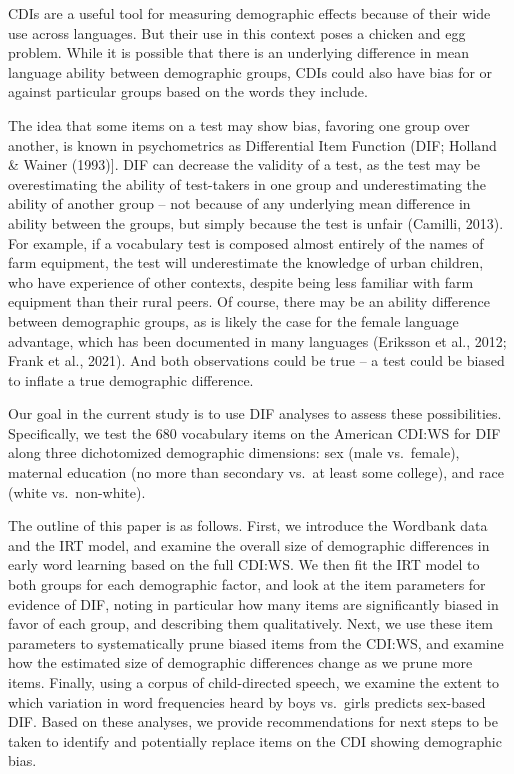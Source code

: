 \documentclass[10pt, letterpaper]{article}
\begin{document}
CDIs are a useful tool for measuring demographic effects because of
their wide use across languages. But their use in this context poses a
chicken and egg problem. While it is possible that there is an
underlying difference in mean language ability between demographic
groups, CDIs could also have bias for or against particular groups based
on the words they include.

The idea that some items on a test may show bias, favoring one group
over another, is known in psychometrics as Differential Item Function
(DIF; Holland \& Wainer (1993){]}. DIF can decrease the validity of a
test, as the test may be overestimating the ability of test-takers in
one group and underestimating the ability of another group -- not
because of any underlying mean difference in ability between the groups,
but simply because the test is unfair (Camilli, 2013). For example, if a
vocabulary test is composed almost entirely of the names of farm
equipment, the test will underestimate the knowledge of urban children,
who have experience of other contexts, despite being less familiar with
farm equipment than their rural peers. Of course, there may be an
ability difference between demographic groups, as is likely the case for
the female language advantage, which has been documented in many
languages (Eriksson et al., 2012; Frank et al., 2021). And both
observations could be true -- a test could be biased to inflate a true
demographic difference.

Our goal in the current study is to use DIF analyses to assess these
possibilities. Specifically, we test the 680 vocabulary items on the
American CDI:WS for DIF along three dichotomized demographic dimensions:
sex (male vs.~female), maternal education (no more than secondary vs.~at
least some college), and race (white vs.~non-white).

The outline of this paper is as follows. First, we introduce the
Wordbank data and the IRT model, and examine the overall size of
demographic differences in early word learning based on the full CDI:WS.
We then fit the IRT model to both groups for each demographic factor,
and look at the item parameters for evidence of DIF, noting in
particular how many items are significantly biased in favor of each
group, and describing them qualitatively. Next, we use these item
parameters to systematically prune biased items from the CDI:WS, and
examine how the estimated size of demographic differences change as we
prune more items. Finally, using a corpus of child-directed speech, we
examine the extent to which variation in word frequencies heard by boys
vs.~girls predicts sex-based DIF. Based on these analyses, we provide
recommendations for next steps to be taken to identify and potentially
replace items on the CDI showing demographic bias.
\end{document}
